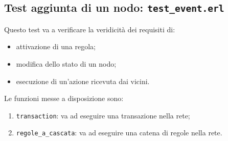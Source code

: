 \documentclass[italian]{memoir}
\begin{document}
\subsection{Test aggiunta di un nodo: \texttt{test\_event.erl}}
Questo test va a verificare la veridicità dei requisiti di:
\begin{itemize}
    \item attivazione di una regola;
    \item modifica dello stato di un nodo;
    \item esecuzione di un'azione ricevuta dai vicini.
\end{itemize}
Le funzioni messe a disposizione sono:
\begin{enumerate}
    \item \texttt{transaction}: va ad eseguire una transazione nella rete;
    \item \texttt{regole\_a\_cascata}: va ad eseguire una catena di regole nella rete.
\end{enumerate}
\end{document}
